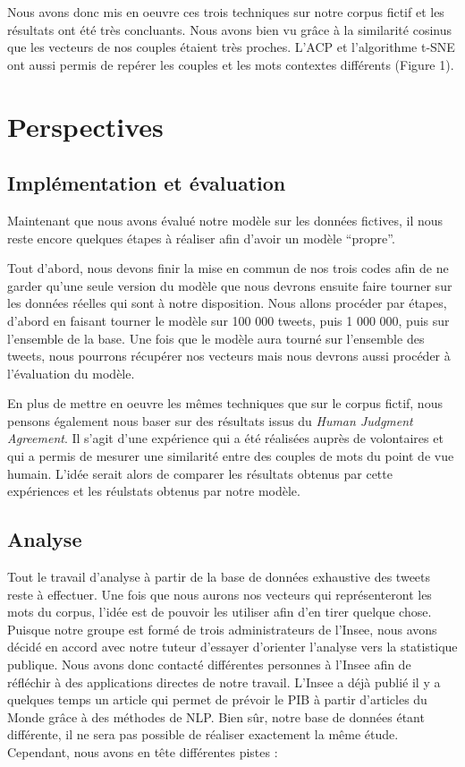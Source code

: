 \documentclass[11pt,french,french]{article}
\begin{document}
Nous avons donc mis en oeuvre ces trois techniques sur notre corpus
fictif et les résultats ont été très concluants. Nous avons bien vu
grâce à la similarité cosinus que les vecteurs de nos couples étaient
très proches. L'ACP et l'algorithme t-SNE ont aussi permis de repérer
les couples et les mots contextes différents (Figure 1).

\section{Perspectives}\label{perspectives}

\subsection{Implémentation et
évaluation}\label{impluxe9mentation-et-uxe9valuation}

Maintenant que nous avons évalué notre modèle sur les données fictives,
il nous reste encore quelques étapes à réaliser afin d'avoir un modèle
``propre''.

Tout d'abord, nous devons finir la mise en commun de nos trois codes
afin de ne garder qu'une seule version du modèle que nous devrons
ensuite faire tourner sur les données réelles qui sont à notre
disposition. Nous allons procéder par étapes, d'abord en faisant tourner
le modèle sur 100 000 tweets, puis 1 000 000, puis sur l'ensemble de la
base. Une fois que le modèle aura tourné sur l'ensemble des tweets, nous
pourrons récupérer nos vecteurs mais nous devrons aussi procéder à
l'évaluation du modèle.

En plus de mettre en oeuvre les mêmes techniques que sur le corpus
fictif, nous pensons également nous baser sur des résultats issus du
\emph{Human Judgment Agreement}. Il s'agit d'une expérience qui a été
réalisées auprès de volontaires et qui a permis de mesurer une
similarité entre des couples de mots du point de vue humain. L'idée
serait alors de comparer les résultats obtenus par cette expériences et
les réulstats obtenus par notre modèle.

\subsection{Analyse}\label{analyse}

Tout le travail d'analyse à partir de la base de données exhaustive des
tweets reste à effectuer. Une fois que nous aurons nos vecteurs qui
représenteront les mots du corpus, l'idée est de pouvoir les utiliser
afin d'en tirer quelque chose. Puisque notre groupe est formé de trois
administrateurs de l'Insee, nous avons décidé en accord avec notre
tuteur d'essayer d'orienter l'analyse vers la statistique publique. Nous
avons donc contacté différentes personnes à l'Insee afin de réfléchir à
des applications directes de notre travail. L'Insee a déjà publié il y a
quelques temps un article qui permet de prévoir le PIB à partir
d'articles du Monde grâce à des méthodes de NLP. Bien sûr, notre base de
données étant différente, il ne sera pas possible de réaliser exactement
la même étude. Cependant, nous avons en tête différentes pistes :
\end{document}
